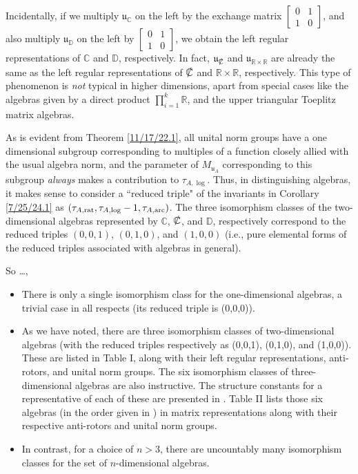 \documentclass{amsart}
\numberwithin{equation}{section}
\theoremstyle{definition}
\numberwithin{theorem}{section}
\begin{document}
Incidentally, if we multiply $\mathfrak{u}_{\mathbb{C}}$ on the left by the exchange matrix $\left[\begin{array}{ccc}
 0 & 1   \\ 
 1 & 0    
\end{array}\right]$, and also multiply $\mathfrak{u}_{\mathbb{D}}$ on the left by $\left[\begin{array}{ccc}
 0 & 1   \\ 
 1 & 0    
\end{array}\right]$, we obtain the left regular representations of $\mathbb{C}$ and $\mathbb{D}$, respectively.   In fact, $\mathfrak{u}_{\slashed{\mathbb{C}}}$ and $\mathfrak{u}_{\mathbb{R}\times\mathbb{R}}$ are already the same as the left regular representations of $\slashed{\mathbb{C}}$ and $\mathbb{R}\times\mathbb{R}$, respectively.  This type of phenomenon is {\it not} typical in higher dimensions, apart from special cases like the algebras given by a direct product $\prod_{i=1}^k \mathbb{R}$, and the upper triangular Toeplitz matrix algebras.

As is evident from Theorem \ref{11/17/22.1}, all unital norm groups have a one dimensional subgroup corresponding to multiples of a function closely allied with the usual algebra norm, and the parameter of $M_{\mathfrak{u}_A}$ corresponding to this subgroup {\it always} makes a contribution to $\tau_{A,\log}$.  Thus, in distinguishing algebras, it makes sense to consider a ``reduced triple" of the invariants in Corollary \ref{7/25/24.1} as $(\tau_{A,{\rm rat}},\tau_{A,{\rm log}}-1,\tau_{A,{\rm arc}})$. 
 The three isomorphism classes of the two-dimensional algebras represented by $\mathbb{C}$, $\slashed{\mathbb{C}}$, and $\mathbb{D}$, respectively correspond to the reduced triples  $(0,0,1)$, $(0,1,0)$, and $(1,0,0)$ (i.e., pure elemental forms of the reduced triples associated with algebras in general).  
 
\bigskip
 
 So \dots,
 
 \begin{itemize}
\item There is only a single isomorphism class for the one-dimensional algebras, a trivial case in all respects (its reduced triple is (0,0,0)).
\item
As we have noted, there are three isomorphism classes of two-dimensional algebras (with the reduced triples respectively as (0,0,1), (0,1,0), and (1,0,0)). These are listed in Table I, along with their left regular representations, anti-rotors, and unital norm groups. 
The six isomorphism classes of three-dimensional algebras are also instructive.  The structure constants for a representative of each of these are presented in \cite{kobayashi:2021}.  Table II lists those six algebras (in the order given in \cite{kobayashi:2021}) in matrix representations along with their respective anti-rotors and unital norm groups. 
\item 
In contrast, for a choice of $n>3$, there are uncountably many isomorphism classes for the set of $n$-dimensional algebras.
\end{itemize}
\end{document}
